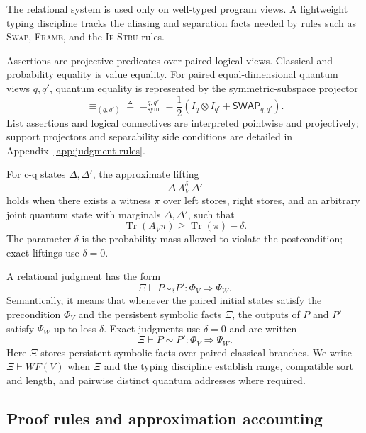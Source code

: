 \documentclass[conference,compsoc]{IEEEtran}
\newcommand{\Tr}{\operatorname{Tr}}
\begin{document}
The relational system is used only on well-typed program views. A lightweight
typing discipline tracks the aliasing and separation facts needed by rules such
as \textsc{Swap}, \textsc{Frame}, and the \textsc{If-Stru} rules.

Assertions are projective predicates over paired logical views. Classical and
probability equality is value equality. For paired equal-dimensional quantum
views \(q,q'\), quantum equality is represented by the symmetric-subspace
projector
\[
\equiv_{(q,q')}
\triangleq
=_{\mathrm{sym}}^{q,q'}
=
\frac12
\left(
I_q\otimes I_{q'}
+
\mathsf{SWAP}_{q,q'}
\right).
\]
List assertions and logical connectives are interpreted pointwise and projectively; support projectors and separability side conditions are detailed
in Appendix~\ref{app:judgment-rules}.

For c-q states \(\Delta,\Delta'\), the approximate lifting
\[
\Delta\, A_V^\delta\,\Delta'
\]
holds when there exists a witness \(\pi\) over left stores, right stores, and an
arbitrary joint quantum state with marginals \(\Delta,\Delta'\), such that
\[
\Tr(A_V\pi)\ge\Tr(\pi)-\delta .
\]
The parameter \(\delta\) is the probability mass allowed to violate the
postcondition; exact liftings use \(\delta=0\).

A relational judgment has the form
\[
\Xi
\vdash P\sim_{\delta}P':
\Phi_V\Longrightarrow\Psi_W .
\]
Semantically, it means that whenever the paired initial states satisfy the
precondition \(\Phi_V\) and the persistent symbolic facts \(\Xi\), the outputs
of \(P\) and \(P'\) satisfy \(\Psi_W\) up to loss \(\delta\).
Exact judgments use
\(\delta=0\) and are written
\[
\Xi
\vdash P\sim P':\Phi_V\Longrightarrow\Psi_W .
\]
Here \(\Xi\) stores persistent symbolic facts over paired classical branches.
We write \(\Xi\vdash WF(V)\) when \(\Xi\) and the typing discipline establish
range, compatible sort and length, and pairwise distinct quantum addresses where
required.

\subsection{Proof rules and approximation accounting}
\label{sec:assert-rules}
\end{document}
